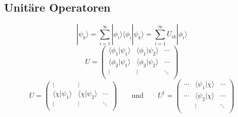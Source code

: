 \documentclass[9pt]{report}
\begin{document}
\subsection{Unitäre Operatoren}
\begin{equation}
|\psi_k\rangle=\sum_{i=1}^{\infty}|\phi_i\rangle\langle\phi_{i}|\psi_{k}\rangle=\sum_{i=1}^{\infty}U_{ik}|\phi_i\rangle
\end{equation}
\begin{equation}
\renewcommand{\arraystretch}{1.7}
U = \left(\begin{array}{cccc}
\big\langle\phi_1\big|\psi_{1}\big\rangle &
\big\langle\phi_1\big|\psi_{2}\big\rangle &
\cdots\\
\big\langle\phi_2\big|\psi_{1}\big\rangle & 
\big\langle\phi_2\big|\psi_{2}\big\rangle & 
\cdots\\
\vdots & 
\vdots & 
\ddots\\\end{array}\right)
\end{equation}
\begin{equation}
\renewcommand{\arraystretch}{1.7}
U = \left(\begin{array}{ccc}
\vdots &
\vdots &
        \\
\big\langle\chi\big|\psi_{1}\big\rangle & 
\big\langle\chi\big|\psi_{2}\big\rangle & 
\cdots \\
\vdots & 
\vdots & 
\ddots \\\end{array}\right)
\qquad\mathrm{und}\qquad
U^{\dagger}= \left(\begin{array}{ccc}
\cdots &
\big\langle\psi_{1}\big|\chi\big\rangle &
\cdots \\
\cdots & 
\big\langle\psi_{2}\big|\chi\big\rangle & 
\cdots \\
       & 
\vdots & 
\ddots \\\end{array}\right)
\end{equation}
\end{document}
